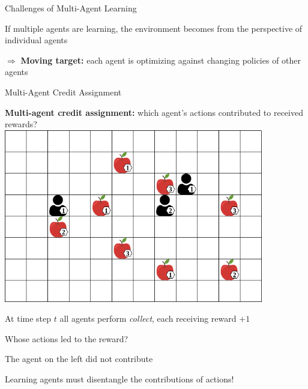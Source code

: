 	\begin{frame}{Challenges of Multi-Agent Learning}
		\bcol
				
				\vspace{5pt}
				
				If multiple agents are learning, the environment becomes  from the perspective of individual agents
				
				\vspace{15pt}
				
				$\Rightarrow$ {\bf Moving target:} each agent is optimizing against changing policies of other agents
				
				\vspace{10pt}
		\ecol
	\end{frame}

\begin{frame}{Multi-Agent Credit Assignment}

{\bf Multi-agent credit assignment:} which agent's actions contributed to received rewards? \\[15pt]

\bcol
            \centering
            \includegraphics[width=0.85\textwidth]{images/environments/lbf/foraging_8x12_b.png}

        \blist
            \item At time step $t$ all agents perform \textit{collect}, each receiving reward $+1$
            \item Whose actions led to the reward?
            \item The agent on the left did not contribute
            \item Learning agents must disentangle the contributions of actions!
        \elist

\ecol
    
\end{frame}


